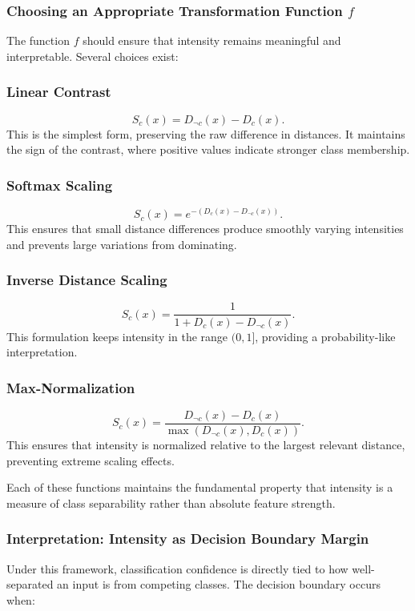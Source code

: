 \subsubsection{Choosing an Appropriate Transformation Function \( f \)}

The function \( f \) should ensure that intensity remains meaningful and interpretable. Several choices exist:

\subsubsection{Linear Contrast}
\[
S_c(x) = D_{\neg c}(x) - D_c(x).
\]
This is the simplest form, preserving the raw difference in distances. It maintains the sign of the contrast, where positive values indicate stronger class membership.

\subsubsection{Softmax Scaling}
\[
S_c(x) = e^{-(D_c(x) - D_{\neg c}(x))}.
\]
This ensures that small distance differences produce smoothly varying intensities and prevents large variations from dominating.

\subsubsection{Inverse Distance Scaling}
\[
S_c(x) = \frac{1}{1 + D_c(x) - D_{\neg c}(x)}.
\]
This formulation keeps intensity in the range \( (0,1] \), providing a probability-like interpretation.

\subsubsection{Max-Normalization}
\[
S_c(x) = \frac{D_{\neg c}(x) - D_c(x)}{\max(D_{\neg c}(x), D_c(x))}.
\]
This ensures that intensity is normalized relative to the largest relevant distance, preventing extreme scaling effects.

Each of these functions maintains the fundamental property that intensity is a measure of class separability rather than absolute feature strength.

\subsubsection{Interpretation: Intensity as Decision Boundary Margin}

Under this framework, classification confidence is directly tied to how well-separated an input is from competing classes. The decision boundary occurs when:

